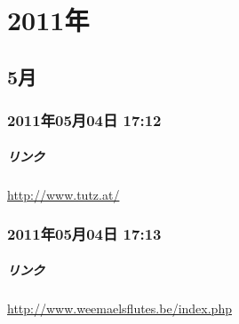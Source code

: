 \documentclass[facebook_diary.tex]{subfiles}
\begin{document}
\chapter{2011年}

\section{5月}

\subsection*{2011年05月04日 17:12}

\paragraph{リンク}
\url{http://www.tutz.at/}

\subsection*{2011年05月04日 17:13}

\paragraph{リンク}
\url{http://www.weemaelsflutes.be/index.php}
\end{document}

